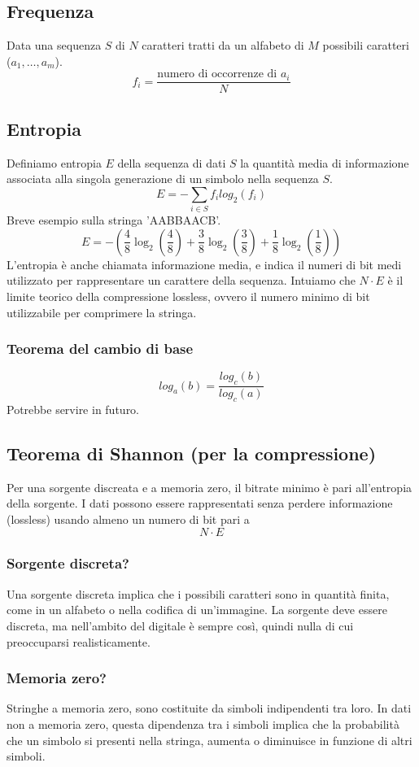 \documentclass{report}
\begin{document}
	\subsection{Frequenza}
	Data una sequenza $S$ di $N$ caratteri tratti da un alfabeto di $M$ possibili caratteri ($a_1,\dots,a_m$).
	$$
	f_i = \frac{\text{numero di occorrenze di $a_i$}}{N}
	$$
	
	\subsection{Entropia}
	Definiamo entropia $E$ della sequenza di dati $S$ la quantità media di informazione associata alla singola generazione di un simbolo nella sequenza $S$.
	$$
	E = - \sum_{i \in S} f_i log_2(f_i)
	$$
	Breve esempio sulla stringa 'AABBAACB'.
	$$
	E = -(\frac{4}{8}\log_2(\frac{4}{8}) + \frac{3}{8}\log_2(\frac{3}{8})+\frac{1}{8}\log_2(\frac{1}{8}))
	$$
	L'entropia è anche chiamata informazione media, e indica il numeri di bit medi utilizzato per rappresentare un carattere della sequenza. Intuiamo che $N \cdot E$ è il limite teorico della compressione lossless, ovvero il numero minimo di bit utilizzabile per comprimere la stringa.
	\subsubsection{Teorema del cambio di base}
	$$
	log_a(b) = \frac{log_c(b)}{log_c(a)}
	$$
	Potrebbe servire in futuro.
	\subsection{Teorema di Shannon (per la compressione)}
	Per una sorgente discreata e a memoria zero, il bitrate minimo è pari all'entropia della sorgente. I dati possono essere rappresentati senza perdere informazione (lossless) usando almeno un numero di bit pari a 
	$$N \cdot E$$
	\subsubsection{Sorgente discreta?}
	Una sorgente discreta implica che i possibili caratteri sono in quantità finita, come in un alfabeto o nella codifica di un'immagine. La sorgente deve essere discreta, ma nell'ambito del digitale è sempre così, quindi nulla di cui preoccuparsi realisticamente.
	
	\subsubsection{Memoria zero?}
	Stringhe a memoria zero, sono costituite da simboli indipendenti tra loro.
	In dati non a memoria zero, questa dipendenza tra i simboli implica che la probabilità che un simbolo si presenti nella stringa, aumenta o diminuisce in funzione di altri simboli.
	
\end{document}
